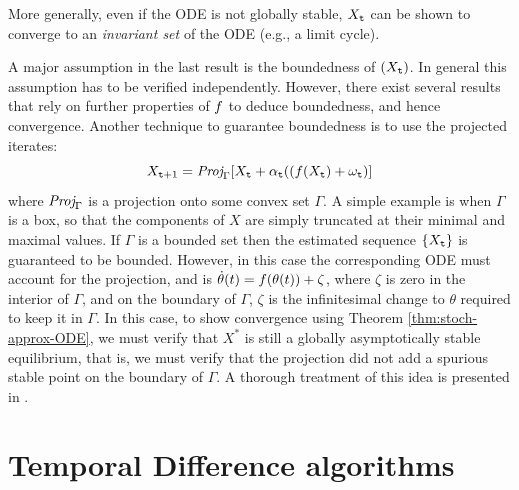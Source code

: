 \begin{remark}
More generally, even if the ODE is not globally stable, $X_{\tt t}$ can be shown to converge
to an {\em invariant set} of the ODE (e.g., a limit cycle).
\end{remark}
\begin{remark}
A major assumption in the last result is the boundedness of $(X_{\tt t})$.
In general this assumption has to be verified independently. However, there
exist several results that rely on further properties of $f$ to deduce
boundedness, and hence convergence. Another technique to guarantee boundedness
is to use the projected iterates:
$$
X_{{\tt t}+1} = \text{\it Proj}_\Gamma [X_{\tt t}+\alpha_{\tt t}((f(X_{\tt t})+\omega_{\tt t}) ]
$$
where $\text{\it Proj}_\Gamma$ is a projection onto some convex set $\Gamma$.
A simple example is when $\Gamma$ is a box, so that the components of $X$ are simply truncated at their minimal and maximal values. 
If $\Gamma$ is a bounded set then the estimated sequence $\{X_{\tt t}\}$ is guaranteed
to be bounded. However, in this case the corresponding ODE must account for the projection, and is $\dot \theta(t) = f(\theta(t)) + \zeta$, where $\zeta$ is zero in the interior of $\Gamma$, and on the boundary of $\Gamma$, $\zeta$ is the infinitesimal change to $\theta$ required to keep it in $\Gamma$. In this case, to show convergence using Theorem \ref{thm:stoch-approx-ODE}, we must verify that $X^*$ is still a globally asymptotically stable equilibrium, that is, we must verify that the projection did not add a spurious stable point on the boundary of $\Gamma$. A thorough treatment of this idea is presented in \cite{kushner2003stochastic}.
\end{remark}

\section{Temporal Difference algorithms}
\label{sec:TD}

